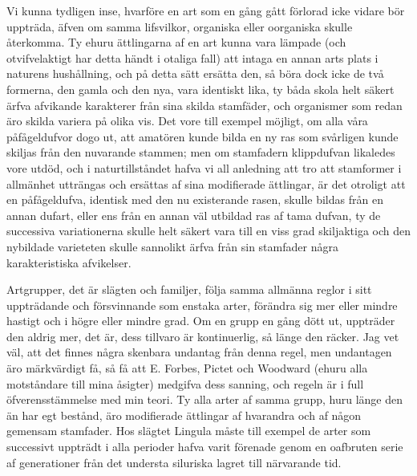 Vi kunna tydligen inse, hvarföre en art som en gång gått förlorad icke vidare bör uppträda, äfven om samma lifsvilkor, organiska eller oorganiska skulle återkomma. Ty ehuru ättlingarna af en art kunna vara lämpade (och otvifvelaktigt har detta händt i otaliga fall) att intaga en annan arts plats i naturens hushållning, och på detta sätt ersätta den, så böra dock icke de två formerna, den gamla och den nya, vara identiskt lika, ty båda skola helt säkert ärfva afvikande karakterer från sina skilda stamfäder, och organismer som redan äro skilda variera på olika vis. Det vore till exempel möjligt, om alla våra påfågeldufvor dogo ut, att amatören kunde bilda en ny ras som svårligen kunde skiljas från den nuvarande stammen; men om stamfadern klippdufvan likaledes vore utdöd, och i naturtillståndet hafva vi all anledning att tro att stamformer i allmänhet utträngas och ersättas af sina modifierade ättlingar, är det otroligt att en påfågeldufva, identisk med den nu existerande rasen, skulle bildas från en annan dufart, eller ens från en annan väl utbildad ras af tama dufvan, ty de successiva variationerna skulle helt säkert vara till en viss grad skiljaktiga och den nybildade varieteten skulle sannolikt ärfva från sin stamfader några karakteristiska afvikelser.

Artgrupper, det är slägten och familjer, följa samma allmänna reglor i sitt uppträdande och försvinnande som enstaka arter, förändra sig mer eller mindre hastigt och i högre eller mindre grad. Om en grupp en gång dött ut, uppträder den aldrig mer, det är, dess tillvaro är kontinuerlig, så länge den räcker. Jag vet väl, att det finnes några skenbara undantag från denna regel, men undantagen äro märkvärdigt få, så få att E. Forbes, Pictet och Woodward (ehuru alla motståndare till mina åsigter) medgifva dess sanning, och regeln är i full öfverensstämmelse med min teori. Ty alla arter af samma grupp, huru länge den än har egt bestånd, äro modifierade ättlingar af hvarandra och af någon gemensam stamfader. Hos slägtet Lingula måste till exempel de arter som successivt uppträdt i alla perioder hafva varit förenade genom en oafbruten serie af generationer från det understa siluriska lagret till närvarande tid.

